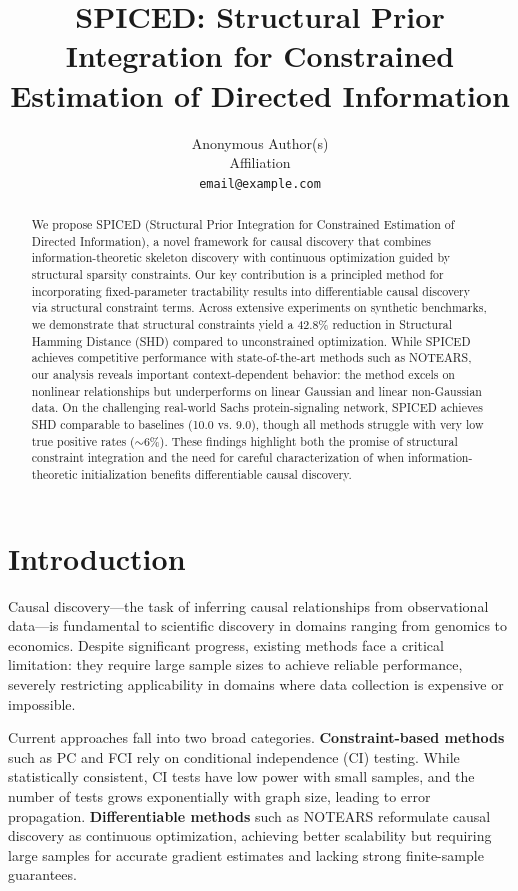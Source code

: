 \documentclass{article}
\title{SPICED: Structural Prior Integration for Constrained Estimation of Directed Information}
\author{
  Anonymous Author(s) \\
  Affiliation \\
  \texttt{email@example.com}
}
\begin{document}
\maketitle

\begin{abstract}
We propose SPICED (Structural Prior Integration for Constrained Estimation of Directed Information), a novel framework for causal discovery that combines information-theoretic skeleton discovery with continuous optimization guided by structural sparsity constraints. Our key contribution is a principled method for incorporating fixed-parameter tractability results into differentiable causal discovery via structural constraint terms. Across extensive experiments on synthetic benchmarks, we demonstrate that structural constraints yield a 42.8\% reduction in Structural Hamming Distance (SHD) compared to unconstrained optimization. While SPICED achieves competitive performance with state-of-the-art methods such as NOTEARS, our analysis reveals important context-dependent behavior: the method excels on nonlinear relationships but underperforms on linear Gaussian and linear non-Gaussian data. On the challenging real-world Sachs protein-signaling network, SPICED achieves SHD comparable to baselines (10.0 vs. 9.0), though all methods struggle with very low true positive rates ($\sim$6\%). These findings highlight both the promise of structural constraint integration and the need for careful characterization of when information-theoretic initialization benefits differentiable causal discovery.
\end{abstract}

\section{Introduction}

Causal discovery---the task of inferring causal relationships from observational data---is fundamental to scientific discovery in domains ranging from genomics to economics. Despite significant progress, existing methods face a critical limitation: they require large sample sizes to achieve reliable performance, severely restricting applicability in domains where data collection is expensive or impossible.

Current approaches fall into two broad categories. \textbf{Constraint-based methods} such as PC \citep{spirtes2000causation} and FCI rely on conditional independence (CI) testing. While statistically consistent, CI tests have low power with small samples, and the number of tests grows exponentially with graph size, leading to error propagation. \textbf{Differentiable methods} such as NOTEARS \citep{zheng2018dags} reformulate causal discovery as continuous optimization, achieving better scalability but requiring large samples for accurate gradient estimates and lacking strong finite-sample guarantees.
\end{document}
